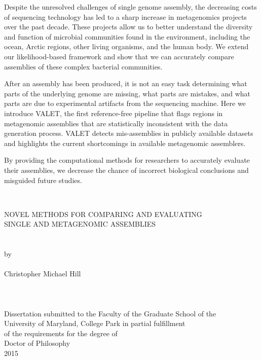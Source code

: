 \documentclass[12pt,\mydriver]{thesis}
\begin{document}
Despite the unresolved challenges of single genome assembly, the decreasing costs of sequencing technology has led to a sharp increase in metagenomics projects over the past decade.
These projects allow us to better understand the diversity and function of microbial communities found in the environment, including the ocean, Arctic regions, other living organisms, and the human body.
We extend our likelihood-based framework and show that we can accurately compare assemblies of these complex bacterial communities.



After an assembly has been produced, it is not an easy task determining what parts of the underlying genome are missing, what parts are mistakes, and what parts are due to experimental artifacts from the sequencing machine.
Here we introduce VALET, the first reference-free pipeline that flags regions in metagenomic assemblies that are statistically inconsistent with the data generation process.
VALET detects mis-assemblies in publicly available datasets and highlights the current shortcomings in available metagenomic assemblers.

By providing the computational methods for researchers to accurately evaluate their assemblies, we decrease the chance of incorrect biological conclusions and misguided future studies.


\clearpage{} 
\clearpage{}
\thispagestyle{empty}
\hbox{\ }
\vspace{1in}
\renewcommand{\baselinestretch}{1}
\small\normalsize
\begin{center}

\large{{\large  NOVEL METHODS FOR COMPARING AND EVALUATING}\\
			 {\large  SINGLE AND METAGENOMIC ASSEMBLIES }}\\
\ \\
\ \\
\large{by} \\
\ \\
\large{Christopher Michael Hill}\ \\
\ \\
\ \\
\ \\
\normalsize
Dissertation submitted to the Faculty of the Graduate School of the \\
University of Maryland, College Park in partial fulfillment \\
of the requirements for the degree of \\
Doctor of Philosophy \\
2015
\end{center}
\end{document}

